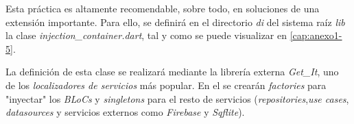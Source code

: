 Esta práctica es altamente recomendable, sobre todo, en soluciones de una
extensión importante. Para ello, se definirá en el directorio \textit{di} del sistema raíz \textit{lib} la clase
\textit{injection\_container.dart}, tal y como se puede visualizar en \autoref{cap:anexo1-5}.

La definición de esta clase se realizará mediante la librería externa \textit{Get\_It}, uno de los \textit{localizadores de servicios}
más popular. En el se crearán \textit{factories} para "inyectar" los \textit{BLoCs} y \textit{singletons} para el resto de
servicios (\textit{repositories},\textit{use cases}, \textit{datasources} y servicios externos como \textit{Firebase} y \textit{Sqflite}).